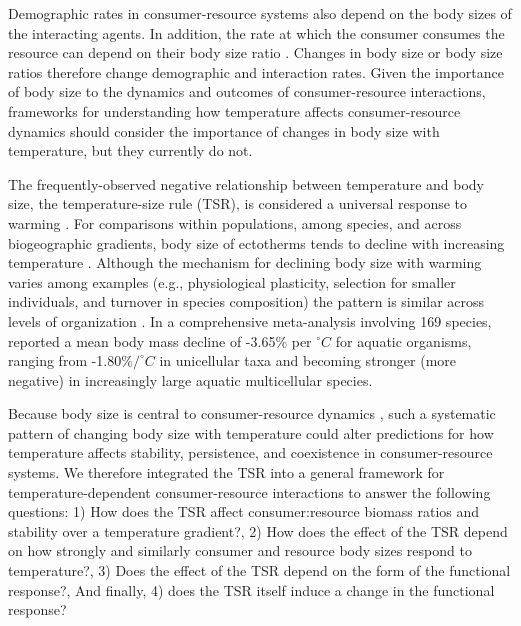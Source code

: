 \documentclass[11pt]{article}
\begin{document}
Demographic rates in consumer-resource systems also depend on the body sizes of the interacting agents\citep{Yodzis1992,DeLong2015}. 
In addition, the rate at which the consumer consumes the resource can depend on their body size ratio \citep{Kalinkat2013}. 
Changes in body size or body size ratios therefore change demographic and interaction rates. 
Given the importance of body size to the dynamics and outcomes of consumer-resource interactions, frameworks for understanding how temperature affects consumer-resource dynamics should consider the importance of changes in body size with temperature, but they currently do not.

The frequently-observed negative relationship between temperature and body size, the temperature-size rule (TSR), is considered a universal response to warming \citep{Gardner2011}. 
%
%
%
%
For comparisons within populations, among species, and across biogeographic gradients, body size of ectotherms tends to decline with increasing temperature \citep{Atkinson1994,Daufresne2009,Forster2012,DeLong2012}. 
Although the mechanism for declining body size with warming varies among examples (e.g., physiological plasticity, selection for smaller individuals, and turnover in species composition) the pattern is similar across levels of organization \citep{Forster2012}. 
In a comprehensive meta-analysis involving 169 species, \citet{Forster2012} reported a mean body mass decline of -3.65$\%$ per $^\circ C$ for aquatic organisms, ranging from -1.80$\% / ^\circ C$ in unicellular taxa and becoming stronger (more negative) in increasingly large aquatic multicellular species.

Because body size is central to consumer-resource dynamics \citep{Yodzis1992}, such a systematic pattern of changing body size with temperature could alter predictions for how temperature affects stability, persistence, and coexistence in consumer-resource systems. 
We therefore integrated the TSR into a general framework for temperature-dependent consumer-resource interactions to answer the following questions: 
1) How does the TSR affect consumer:resource biomass ratios and stability over a temperature gradient?, 
2) How does the effect of the TSR depend on how strongly and similarly consumer and resource body sizes respond to temperature?, 
3) Does the effect of the TSR depend on the form of the functional response?, 
And finally, 4) does the TSR itself induce a change in the functional response?
\end{document}
